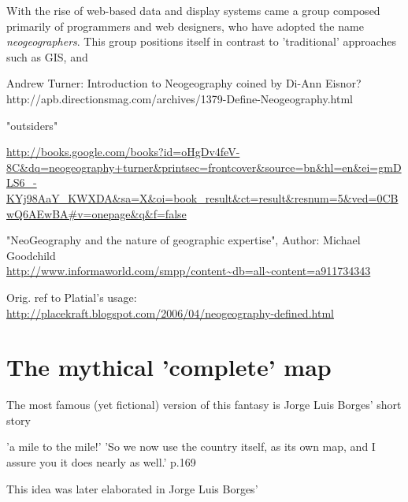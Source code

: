 \documentclass[11pt]{report}
\begin{document}
With the rise of web-based data and display systems came a group composed primarily of programmers and web designers, who have adopted the name \emph{neogeographers}. This group positions itself in contrast to 'traditional' approaches such as GIS, and 


Andrew Turner: Introduction to Neogeography
coined by Di-Ann Eisnor?
http://apb.directionsmag.com/archives/1379-Define-Neogeography.html

"outsiders"

\url{http://books.google.com/books?id=oHgDv4feV-8C&dq=neogeography+turner&printsec=frontcover&source=bn&hl=en&ei=gmDLS6_-KYj98AaY_KWXDA&sa=X&oi=book_result&ct=result&resnum=5&ved=0CBwQ6AEwBA#v=onepage&q&f=false}

"NeoGeography and the nature of geographic expertise", Author: Michael Goodchild  \url{http://www.informaworld.com/smpp/content~db=all~content=a911734343}

Orig. ref to Platial's usage: \url{http://placekraft.blogspot.com/2006/04/neogeography-defined.html}


\section{The mythical 'complete' map}

The most famous (yet fictional) version of this fantasy is Jorge Luis Borges' short story 

'a mile to the mile!'
'So we now use the country itself, as its own map, and I assure you it does nearly as well.' p.169

This idea was later elaborated in Jorge Luis Borges' 


\end{document}
